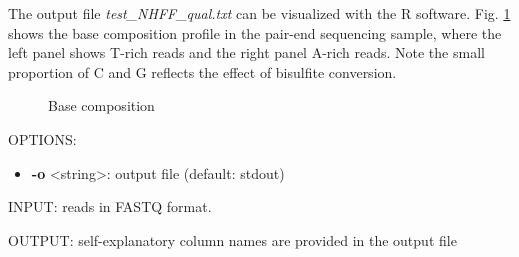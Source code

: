 \documentclass{article}
\begin{document}
The output file \textit{test\_NHFF\_qual.txt} can be visualized with the R software.
Fig. \ref{fig:base-composition} shows the base composition profile in
the pair-end sequencing sample, where the left panel shows  T-rich
reads and the right panel A-rich reads. Note the small proportion of C
and G reflects the effect of bisulfite conversion.

\begin{figure}[htbp]
  \centering
{}
  \caption{Base composition}
  \label{fig:base-composition}
\end{figure}

OPTIONS:
\begin{itemize}
\item
\textbf{-o} \textless string\textgreater : output file (default: stdout)
\end{itemize}

INPUT: reads in FASTQ format.

OUTPUT: self-explanatory column names are provided in the output file
\end{document}
